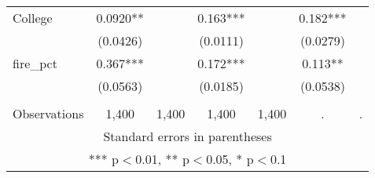 \begin{tabular}{lcccccc}
College & 0.0920** &  & 0.163*** &  & 0.182*** &  \\
 & (0.0426) &  & (0.0111) &  & (0.0279) &  \\
fire\_pct & 0.367*** &  & 0.172*** &  & 0.113** &  \\
 & (0.0563) &  & (0.0185) &  & (0.0538) &  \\
 &  &  &  &  &  &  \\
 Observations & 1,400 & 1,400 & 1,400 & 1,400 & . & . \\ \hline
\multicolumn{7}{c}{ Standard errors in parentheses} \\
\multicolumn{7}{c}{ *** p$<$0.01, ** p$<$0.05, * p$<$0.1} \\
\end{tabular}

